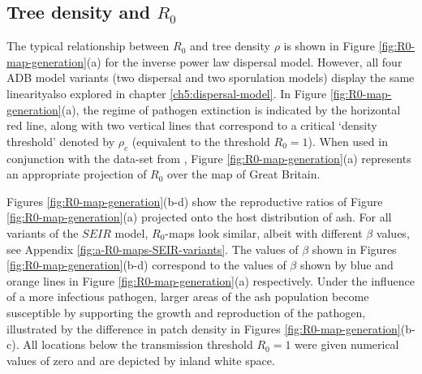 

\subsection{Tree density and $R_0$}
\label{section:r0-tree-density}

The typical relationship between $R_0$ and tree density $\rho$ is shown in Figure \ref{fig:R0-map-generation}(a) for the inverse power law dispersal model. However, all four ADB model variants (two dispersal and two sporulation models) display the same linearity\textemdash also explored in chapter \ref{ch5:dispersal-model}. In Figure \ref{fig:R0-map-generation}(a), the regime of pathogen extinction is indicated by the horizontal red line, along with two vertical lines that correspond to a critical `density threshold' denoted by $\rho_c$ (equivalent to the threshold $R_0 = 1$). When used in conjunction with the data-set from \cite{hill.data}, Figure \ref{fig:R0-map-generation}(a) represents an appropriate projection of $R_0$ over the map of Great Britain.

Figures \ref{fig:R0-map-generation}(b-d) show the reproductive ratios of Figure \ref{fig:R0-map-generation}(a) projected onto the host distribution of ash. 
For all variants of the $SEIR$ model, $R_0$-maps look similar, albeit with different $\beta$ values, see Appendix \ref{fig:a-R0-maps-SEIR-variants}. 
The values of $\beta$ shown in Figures \ref{fig:R0-map-generation}(b-d) correspond to the values of $\beta$ shown by blue and orange lines in Figure \ref{fig:R0-map-generation}(a) respectively. 
Under the influence of a more infectious pathogen, larger areas of the ash population become susceptible by supporting the growth and reproduction of the pathogen, illustrated by the difference in patch density in Figures \ref{fig:R0-map-generation}(b-c). 
All locations below the transmission threshold $R_0=1$ were given numerical values of zero and are depicted by inland white space.

